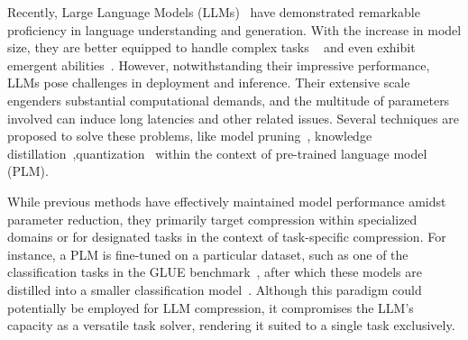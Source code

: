 Recently, Large Language Models (LLMs)~\cite{openai2023gpt4,touvron2023llama,thoppilan2022lamda,scao2022bloom,xue2020mt5,vicuna2023,zeng2022glm} have demonstrated remarkable proficiency in language understanding and generation. With the increase in model size, they are better equipped to handle complex tasks ~\cite{brown2020language,chowdhery2022palm,wei2022chain,wu2020biased} and even exhibit emergent abilities~\cite{weiemergent}. However, notwithstanding their impressive performance, LLMs pose challenges in deployment and inference. Their extensive scale engenders substantial computational demands, and the multitude of parameters involved can induce long latencies and other related issues. 
Several techniques are proposed to solve these problems, like model pruning~\cite{wang2019structured,xia2022structured,zafrir2021prune,kurtic2022optimal}, knowledge distillation~\cite{sun2019patient,pan2020meta,sun-etal-2020-contrastive},quantization~\cite{bai2020binarybert,frantar2022gptq} within the context of pre-trained language model (PLM). 

While previous methods have effectively maintained model performance amidst parameter reduction, they primarily target compression within specialized domains or for designated tasks in the context of task-specific compression. For instance, a PLM is fine-tuned on a particular dataset, such as one of the classification tasks in the GLUE benchmark~\cite{wang2018glue}, after which these models are distilled into a smaller classification model~\cite{sun2019patient,hou2020dynabert}. Although this paradigm could potentially be employed for LLM compression, it compromises the LLM's capacity as a versatile task solver, rendering it suited to a single task exclusively.

